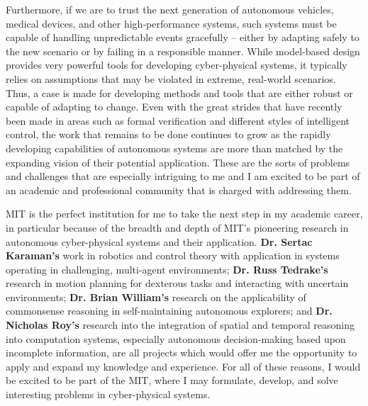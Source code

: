 \documentclass[11pt]{letter}
\begin{document}
Furthermore, if we are to trust the next generation of autonomous vehicles, medical devices, and other high-performance systems, such systems must be capable of handling unpredictable events gracefully -- either by adapting safely to the new scenario or by failing in a responsible manner. While model-based design provides very powerful tools for developing cyber-physical systems, it typically relies on assumptions that may be violated in extreme, real-world scenarios. Thus, a case is made for developing methods and tools that are either robust or capable of adapting to change. Even with the great strides that have recently been made in areas such as formal verification and different styles of intelligent control, the work that remains to be done continues to grow as the rapidly developing capabilities of autonomous systems are more than matched by the expanding vision of their potential application.  These are the sorts of problems and challenges that are especially intriguing to me and I am excited to be part of an academic and professional community that is charged with addressing them.

MIT is the perfect institution for me to take the next step in my academic career, in particular because of the breadth and depth of MIT’s pioneering research in autonomous cyber-physical systems and their application.  \textbf{Dr. Sertac Karaman's} work in robotics and control theory with application in systems operating in challenging, multi-agent environments; \textbf{Dr. Russ Tedrake's} research in motion planning for dexterous tasks and interacting with uncertain environments; \textbf{Dr. Brian William's} research on the applicability of commonsense reasoning in self-maintaining autonomous explorers; and \textbf{Dr. Nicholas Roy's} research into the integration of spatial and temporal reasoning into computation systems, especially autonomous decision-making based upon incomplete information, are all projects which would offer me the opportunity to apply and expand my knowledge and experience.  For all of these reasons, I would be excited to be part of the MIT, where I may formulate, develop, and solve interesting problems in cyber-physical systems.

\begin{comment}
{\bf \emph{References}}

[1] "Cyber-Physical Systems." Baheti and Gill

[2] "Optimization and Control of Cyber-Physical Vehicle Systems." Bradley and Atkins

\end{comment}
\end{document}
